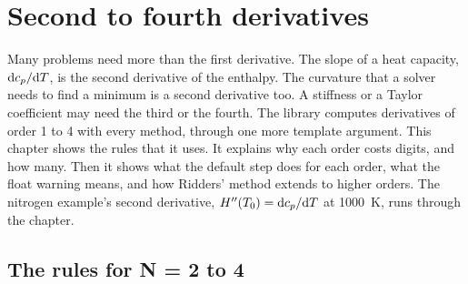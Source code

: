 \chapter{Second to fourth derivatives}\label{ch:orders}

Many problems need more than the first derivative. The slope of a heat capacity, $\mathrm{d} c_p / \mathrm{d} T$, is the second
derivative of the enthalpy. The curvature that a solver needs to find a minimum is a second derivative too. A
stiffness or a Taylor coefficient may need the third or the fourth. The library computes derivatives of order 1 to 4
with every method, through one more template argument. This chapter shows the rules that it uses. It explains why
each order costs digits, and how many. Then it shows what the default step does for each order, what the float
warning means, and how Ridders' method extends to higher orders. The nitrogen example's second derivative,
$H''(T_0) = \mathrm{d} c_p / \mathrm{d} T$ at \SI{1000}{\kelvin}, runs through the chapter.

\section{The rules for N = 2 to 4}\label{sec:orders-rules}

